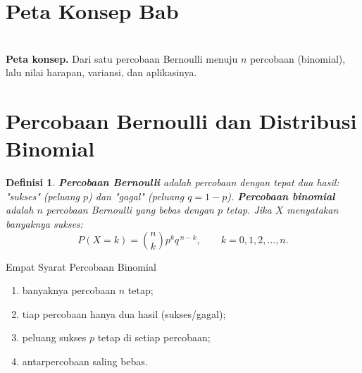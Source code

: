 \documentclass[11pt,a4paper]{report}
\theoremstyle{gaya}
\newtheorem{definisi}{Definisi}[chapter]
\begin{document}
\section*{Peta Konsep Bab}
\begin{center}
\\
\small \textbf{Peta konsep.} Dari satu percobaan Bernoulli menuju $n$ percobaan (binomial), lalu nilai harapan, variansi, dan aplikasinya.
\end{center}

\section{Percobaan Bernoulli dan Distribusi Binomial}
\begin{definisi}
\textbf{Percobaan Bernoulli} adalah percobaan dengan tepat dua hasil: "sukses" (peluang $p$) dan "gagal" (peluang $q=1-p$). \textbf{Percobaan binomial} adalah $n$ percobaan Bernoulli yang \emph{bebas} dengan $p$ tetap. Jika $X$ menyatakan banyaknya sukses:
\[
P(X=k)=\binom nk p^k q^{\,n-k},\qquad k=0,1,2,\dots,n.
\]
\end{definisi}

\begin{konsep}{Empat Syarat Percobaan Binomial}
\begin{enumerate}[leftmargin=*,topsep=2pt,label=(\arabic*)]
  \item banyaknya percobaan $n$ tetap;
  \item tiap percobaan hanya dua hasil (sukses/gagal);
  \item peluang sukses $p$ tetap di setiap percobaan;
  \item antarpercobaan saling bebas.
\end{enumerate}
\end{konsep}
\end{document}
